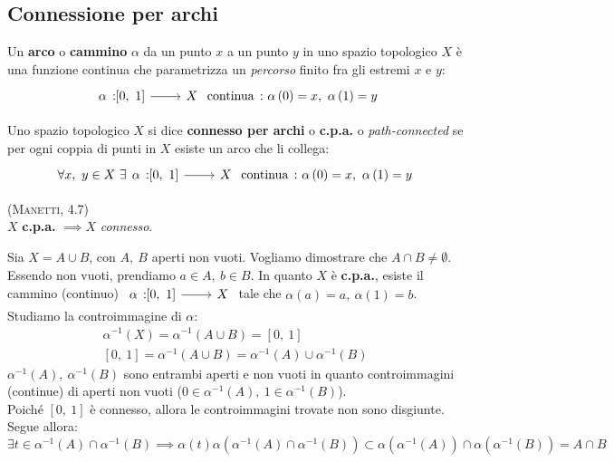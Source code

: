 \subsection{Connessione per archi}
\begin{define}[Arco.]
Un \textbf{arco} o \textbf{cammino} $\alpha$ da un punto $x$ a un punto $y$ in uno spazio topologico $X$ è una funzione continua che parametrizza un \textit{percorso} finito fra gli estremi $x$ e $y$:
\begin{equation}
\funz{\alpha}{\left[0,\ 1\right]}{X} \text{ continua}\ \colon \alpha\left(0\right)=x,\ \alpha\left(1\right)=y
\end{equation}
\vspace{-6mm}
\end{define}
\begin{define}
Uno spazio topologico $X$ si dice \textbf{connesso per archi} o \textbf{c.p.a.} o \textit{path-connected} se per ogni coppia di punti in $X$ esiste un arco che li collega:
\begin{equation}
\forall x,\ y\in X\ \exists \funz{\alpha}{\left[0,\ 1\right]}{X} \text{ continua}\ \colon \alpha\left(0\right)=x,\ \alpha\left(1\right)=y
\end{equation}
\vspace{-6mm}
\end{define}
\begin{theorema}\textsc{(Manetti, 4.7)}\\
$X$ \textbf{c.p.a.} $\implies X$ \textit{connesso}.
\end{theorema}
\begin{demonstration}
	Sia $X=A\cup B$, con $A,\ B$ aperti non vuoti. Vogliamo dimostrare che $A\cap B\neq \emptyset$. Essendo non vuoti, prendiamo $a\in A,\ b\in B$. In quanto $X$ è \textbf{c.p.a.}, esiste il cammino (continuo) $\funz{\alpha}{\left[0,\ 1\right]}{X}$ tale che $\alpha\left(a\right)=a,\ \alpha\left(1\right)=b$.\\
	Studiamo la controimmagine di $\alpha$:
	\begin{gather*}
		\alpha^{-1}\left(X\right)=\alpha^{-1}\left(A\cup B\right)=\left[0,\ 1\right]\\
		\left[0,\ 1\right]=\alpha^{-1}\left(A\cup B\right)=\alpha^{-1}\left(A\right)\cup \alpha^{-1}\left(B\right)
	\end{gather*}
$\alpha^{-1}\left(A\right),\ \alpha^{-1}\left(B\right)$ sono entrambi aperti e non vuoti in quanto controimmagini (continue) di aperti non vuoti ($0\in \alpha^{-1}\left(A\right),\ 1\in \alpha^{-1}\left(B\right)$).\\
Poiché $\left[0,\ 1\right]$ è connesso, allora le controimmagini trovate non sono disgiunte. Segue allora:
\begin{equation*}
\exists t\in \alpha^{-1}\left(A\right)\cap \alpha^{-1}\left(B\right)\implies \alpha\left(t\right)\alpha\left(\alpha^{-1}\left(A\right)\cap \alpha^{-1}\left(B\right)\right)\subset\alpha\left(\alpha^{-1}\left(A\right)\right)\cap\alpha\left(\alpha^{-1}\left(B\right)\right)=A\cap B
\end{equation*}
\end{demonstration}
